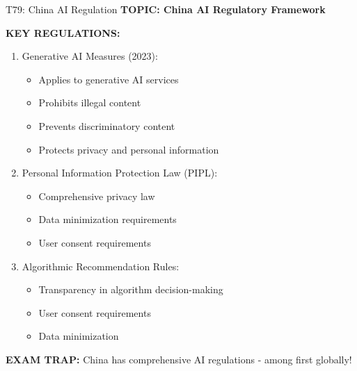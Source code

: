 \documentclass[8pt]{beamer}
\begin{document}
	\begin{frame}{T79: China AI Regulation}
		\fontsize{6.5}{7.5}\selectfont
		\textbf{TOPIC: China AI Regulatory Framework}
		
		\vspace{0.1cm}
		\textbf{KEY REGULATIONS:}
		\begin{enumerate}
			\item \textcolor{myblue}{Generative AI Measures (2023):}
			\begin{itemize}
				\item Applies to generative AI services
				\item Prohibits illegal content
				\item Prevents discriminatory content
				\item Protects privacy and personal information
			\end{itemize}
			\item \textcolor{myblue}{Personal Information Protection Law (PIPL):}
			\begin{itemize}
				\item Comprehensive privacy law
				\item Data minimization requirements
				\item User consent requirements
			\end{itemize}
			\item \textcolor{myblue}{Algorithmic Recommendation Rules:}
			\begin{itemize}
				\item Transparency in algorithm decision-making
				\item User consent requirements
				\item Data minimization
			\end{itemize}
		\end{enumerate}
		
		\textcolor{myred}{\textbf{EXAM TRAP:}} China has \textcolor{myblue}{comprehensive AI regulations} - among first globally!
	\end{frame}
	
\end{document}
